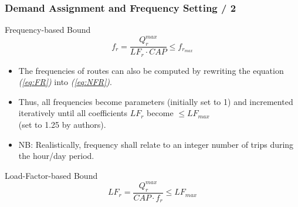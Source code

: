 \documentclass[dvipsnames]{beamer}
\begin{document}
\begin{frame}
  \frametitle{Demand Assignment and Frequency Setting / 2}

  \begin{block}{Frequency-based Bound}
    \begin{equation}
      \label{eq:FR}
      f_r = \frac {Q^{max}_{r}} {LF_r \cdot CAP} \leq f_{r_{max}}
    \end{equation}
  \end{block}

  \begin{itemize}
    \item The frequencies of routes can also be computed by rewriting the equation \textit{(\ref{eq:FR})} into \textit{(\ref{eq:NFR})}.
    \item Thus, all frequencies become parameters (initially set to 1) and incremented iteratively until all coefficients $LF_r$ become $\leq LF_{max}$ \\ (set to 1.25 by authors).
    \item NB: Realistically, frequency shall relate to an integer number of trips during the hour/day period.
  \end{itemize}
  
  \begin{block}{Load-Factor-based Bound}
    \begin{equation}
      \label{eq:NFR}
      LF_r = \frac {Q^{max}_{r}} {CAP \cdot f_r} \leq LF_{max}
    \end{equation}
  \end{block}
\end{frame}
\end{document}
